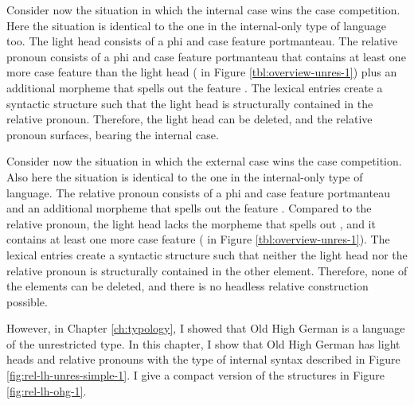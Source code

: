 Consider now the situation in which the internal case wins the case competition. Here the situation is identical to the one in the internal-only type of language too. The light head consists of a phi and case feature portmanteau. The relative pronoun consists of a phi and case feature portmanteau that contains at least one more case feature than the light head ( in Figure \ref{tbl:overview-unres-1}) plus an additional morpheme that spells out the feature . The lexical entries create a syntactic structure such that the light head is structurally contained in the relative pronoun. Therefore, the light head can be deleted, and the relative pronoun surfaces, bearing the internal case.

Consider now the situation in which the external case wins the case competition. Also here the situation is identical to the one in the internal-only type of language. The relative pronoun consists of a phi and case feature portmanteau and an additional morpheme that spells out the feature . Compared to the relative pronoun, the light head lacks the morpheme that spells out , and it contains at least one more case feature ( in Figure \ref{tbl:overview-unres-1}). The lexical entries create a syntactic structure such that neither the light head nor the relative pronoun is structurally contained in the other element. Therefore, none of the elements can be deleted, and there is no headless relative construction possible.

However, in Chapter \ref{ch:typology}, I showed that Old High German is a language of the unrestricted type. In this chapter, I show that Old High German has light heads and relative pronouns with the type of internal syntax described in Figure \ref{fig:rel-lh-unres-simple-1}. I give a compact version of the structures in Figure \ref{fig:rel-lh-ohg-1}.

